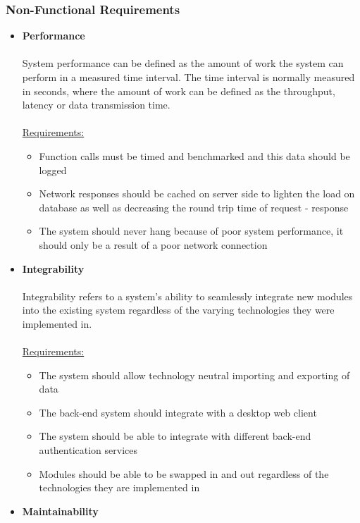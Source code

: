 \documentclass[a4paper,10pt]{article}
\begin{document}
\subsubsection{Non-Functional Requirements}
\begin{itemize}
	\item  \textbf{Performance} \\\\
	System performance can be defined as the amount of work the system can perform in a measured time interval. The time interval is normally measured in seconds, where the amount of work can be defined as the throughput, latency or data transmission time.\\\\
	 \underline{Requirements:}
	 \begin{itemize}
		\item Function calls must be timed and benchmarked and this data should be logged
		\item Network responses should be cached on server side to lighten the load on database as well as decreasing the round trip time of request - response
		\item The system should never hang because of poor system performance, it should only be a result of a poor network connection
	\end{itemize}
	\item  \textbf{Integrability} \\\\
	Integrability refers to a system’s ability to seamlessly integrate new modules into the existing system regardless of the varying technologies they were implemented in.\\\\
	 \underline{Requirements:}
	 \begin{itemize}
		\item The system should allow technology neutral importing and exporting of data
		\item The back-end system should integrate with a desktop web client
		\item The system should be able to integrate with different back-end authentication services
		\item Modules should be able to be swapped in and out regardless of the technologies they are implemented in
	\end{itemize}
	\item  \textbf{Maintainability} \\\\

\end{itemize}
\end{document}
